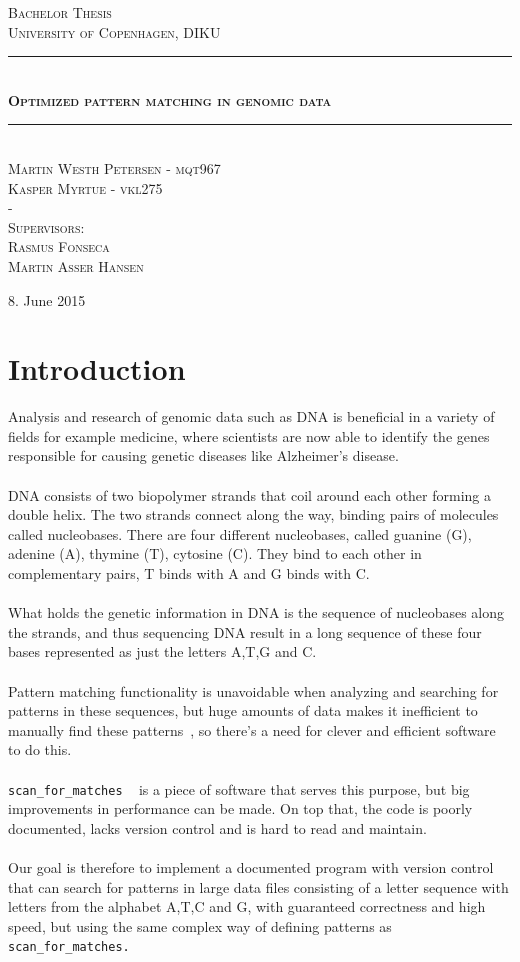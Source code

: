 \documentclass[12pt]{article}
\newcommand{\HRule}{\rule{\linewidth}{0.5mm}}
\newcommand{\scm}{\texttt{scan\_for\_matches} }
\newcommand{\scmp}{\texttt{scan\_for\_matches.} }
\begin{document}
\begin{titlepage}
\begin{center}

\textsc{\Large Bachelor Thesis \\[0.2in]
University of Copenhagen, DIKU}
\HRule \\[0.4cm]
\textsc{\LARGE \bfseries Optimized pattern matching in genomic data}\\[0.1cm]
\HRule \\[1.2cm]
\textsc{\large Martin Westh Petersen - mqt967 \\ Kasper Myrtue - vkl275 \\ -\\
Supervisors: \\ Rasmus Fonseca \\ Martin Asser Hansen}\\[1.0cm]
\end{center}
\begin{center}
\vfill
{\large 8. June 2015}
\end{center}
\end{titlepage}
\tableofcontents \newpage
\section{Introduction}
\nocite{*}
Analysis and research of genomic data such as DNA is beneficial in a variety of fields for example medicine, where
scientists are now able to identify the genes responsible for causing genetic diseases like 
Alzheimer's disease.~\cite{gen} \\ \\
DNA consists of two biopolymer strands that coil around each other forming a double helix. The two strands
connect along the way, binding pairs of molecules called nucleobases. There are four different nucleobases, called
guanine (G), adenine (A), thymine (T), cytosine (C). They bind to each other in complementary pairs, T binds with A and
G binds with C.~\cite{dna} \\ \\
What holds the genetic information in DNA is the sequence of nucleobases along the strands, and thus sequencing DNA
result in a long sequence of these four bases represented as just the letters A,T,G and C. \\ \\
Pattern matching functionality is unavoidable when analyzing and searching for patterns in these sequences, but
huge amounts of data makes it inefficient to manually find these patterns~\cite{gcn}, so there's a need for clever
and efficient software to do this. \\ \\
\scm ~\cite{scm} is a piece of software that serves this purpose, but big improvements in performance can be made.
On top that, the code is poorly documented, lacks version control and is hard to read and maintain. \\ \\
Our goal is therefore to implement a documented program with version control 
that can search for patterns in large data files consisting of a letter sequence
with letters from the alphabet A,T,C and G, with guaranteed correctness
and high speed, but using the same complex way of defining patterns as \scmp 
\end{document}
